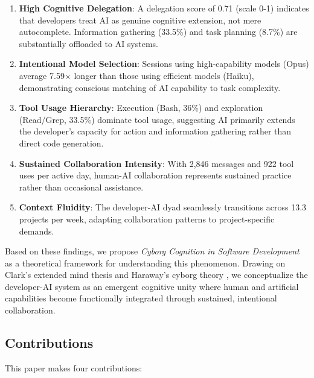 \documentclass{ntlabs-preprint}
\begin{document}
\begin{enumerate}
    \item \textbf{High Cognitive Delegation}: A delegation score of 0.71 (scale 0-1) indicates that developers treat AI as genuine cognitive extension, not mere autocomplete. Information gathering (33.5\%) and task planning (8.7\%) are substantially offloaded to AI systems.

    \item \textbf{Intentional Model Selection}: Sessions using high-capability models (Opus) average 7.59$\times$ longer than those using efficient models (Haiku), demonstrating conscious matching of AI capability to task complexity.

    \item \textbf{Tool Usage Hierarchy}: Execution (Bash, 36\%) and exploration (Read/Grep, 33.5\%) dominate tool usage, suggesting AI primarily extends the developer's capacity for action and information gathering rather than direct code generation.

    \item \textbf{Sustained Collaboration Intensity}: With 2,846 messages and 922 tool uses per active day, human-AI collaboration represents sustained practice rather than occasional assistance.

    \item \textbf{Context Fluidity}: The developer-AI dyad seamlessly transitions across 13.3 projects per week, adapting collaboration patterns to project-specific demands.
\end{enumerate}

Based on these findings, we propose \textit{Cyborg Cognition in Software Development} as a theoretical framework for understanding this phenomenon. Drawing on Clark's extended mind thesis \citep{clark1998extended} and Haraway's cyborg theory \citep{haraway1991cyborg}, we conceptualize the developer-AI system as an emergent cognitive unity where human and artificial capabilities become functionally integrated through sustained, intentional collaboration.

\subsection{Contributions}

This paper makes four contributions:
\end{document}
